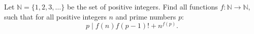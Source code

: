 Let $\mathbb{N} = \{1, 2, 3, \dots \}$ be the set of positive integers. Find all functions $f:\mathbb{N}\rightarrow \mathbb{N}$, such that for all positive integers $n$ and prime numbers $p$:
$$p \mid f(n)f(p-1)!+n^{f(p)}.$$
